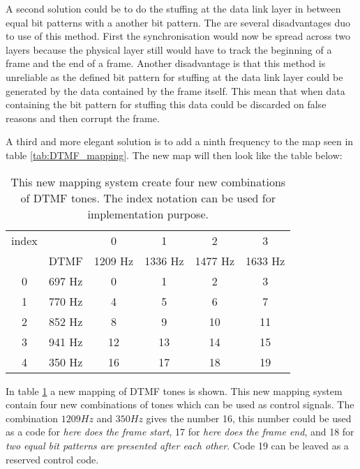 	A second solution could be to do the stuffing at the data link layer in between equal bit patterns with a another bit pattern. 
	The are several disadvantages duo to use of this method. First the synchronisation would now be spread across two layers because
	the physical layer still would have to track the beginning of a frame and the end of a frame. Another disadvantage is that this 
	method is unreliable as the defined bit pattern for stuffing at the data link layer could be generated by the data contained by the 
	frame itself. This mean that when data containing the bit pattern for stuffing this data could be discarded on false reasons and
	then corrupt the frame.
	
	A third and more elegant solution is to add a ninth frequency to the map seen in table \ref{tab:DTMF_mapping}. The new map will
	then look like the table below:
	
	\begin{table}[htb]
		\begin{center}
			\begin{tabular}{c c|c c c c}
	 		index & & 0 & 1 & 2 & 3 \\
			& DTMF & 1209 Hz & 1336 Hz & 1477 Hz & 1633 Hz \\
			\hline
			0 & 697 Hz & 0 & 1 & 2 & 3 \\
			1 & 770 Hz & 4 & 5 & 6 & 7 \\
			2 & 852 Hz & 8 & 9 & 10 & 11 \\
			3 & 941 Hz & 12 & 13 & 14 & 15 \\
			4 & 350 Hz & 16 & 17 & 18 & 19 \\
			\end{tabular}
		\end{center}
		\caption{This new mapping system create four new combinations of DTMF tones. The index notation can be used for
		implementation purpose.}
		\label{tab:newDTMF_mapping}
	\end{table}
	
	In table \ref{tab:newDTMF_mapping} a new mapping of DTMF tones is shown. This new mapping system contain four new combinations of tones
	which can be used as control signals. The combination $1209 Hz$ and $350 Hz$ gives the number 16, this number could be used as a code for
	\textit{here does the frame start}, 17 for \textit{here does the frame end}, and 18 for \textit{two equal bit patterns are presented after
	each other}. Code 19 can be leaved as a reserved control code. 
	
